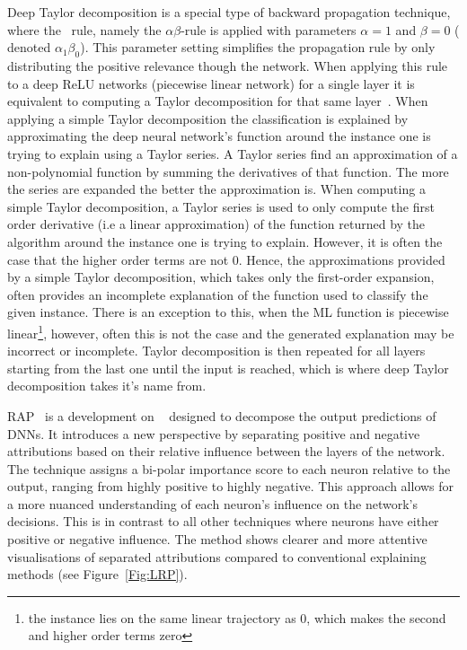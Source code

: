 Deep Taylor decomposition is a special type of backward propagation technique, where the \LRP\ rule, namely the $\alpha\beta$-rule is applied with parameters $\alpha = 1$ and $\beta = 0$ ( denoted $\alpha_{1}\beta_{0}$). This parameter setting simplifies the propagation rule by only distributing the positive relevance though the network. When applying this rule to a deep ReLU networks (piecewise linear network) for a single layer it is equivalent to computing a Taylor decomposition for that same layer~\cite{MontavonLBSM17}. When applying a simple Taylor decomposition the classification is explained by approximating the deep neural network's function around the instance one is trying to explain using a Taylor series. A Taylor series find an approximation of a non-polynomial function by summing the derivatives of that function. The more the series are expanded the better the approximation is. When computing a simple Taylor decomposition, a Taylor series is used to only compute the first order derivative (i.e a linear approximation) of the function returned by the algorithm around the instance one is trying to explain. However, it is often the case that the higher order terms are not 0. Hence, the approximations provided by a simple Taylor decomposition, which takes only the first-order expansion, often provides an incomplete explanation of the function used to classify the given instance. There is an exception to this, when the ML function is piecewise linear\footnote{the instance lies on the same linear trajectory as 0, which makes the second and higher order terms zero}, however, often this is not the case and the generated explanation may be incorrect or incomplete. Taylor decomposition is then repeated for all layers starting from the last one until the input is reached, which is where deep Taylor decomposition takes it's name from.

RAP~\cite{NamGCWL20} is a development on \LRP~\cite{bach2015pixel} designed to decompose the output predictions of DNNs. It introduces a new perspective by separating positive and negative attributions based on their relative influence between the layers of the network. The technique assigns a bi-polar importance score to each neuron relative to the output, ranging from highly positive to highly negative. This approach allows for a more nuanced understanding of each neuron's influence on the network's decisions. This is in contrast to all other techniques where neurons have either positive or negative influence. The method shows clearer and more attentive visualisations of separated attributions compared to conventional explaining methods (see Figure~\ref{Fig:LRP}).


